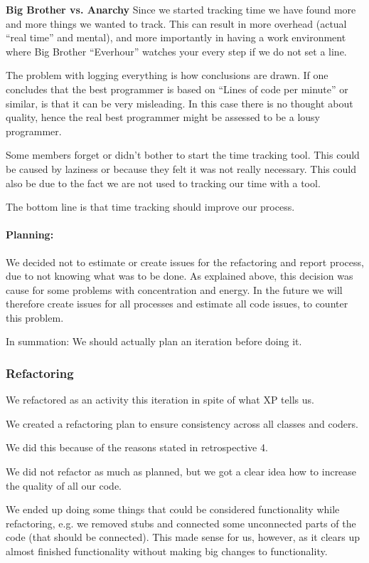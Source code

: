\textbf{Big Brother vs. Anarchy}
Since we started tracking time we have found more and more things we wanted to track. This can result in more overhead (actual “real time” and mental), and more importantly in having a work environment where Big Brother “Everhour” watches your every step if we do not set a line.

The problem with logging everything is how conclusions are drawn. If one concludes that the best programmer is based on “Lines of code per minute” or similar, is that it can be very misleading. In this case there is no thought about quality, hence the real best programmer might be assessed to be a lousy programmer.

Some members forget or didn’t bother to start the time tracking tool. This could be caused by laziness or because they felt it was not really necessary. This could also be due to the fact we are not used to tracking our time with a tool.

The bottom line is that time tracking should improve our process.


\paragraph{Planning:}
We decided not to estimate or create issues for the refactoring and report process, due to not knowing what was to be done.\linebreak
As explained above, this decision was cause for some problems with concentration and energy.
In the future we will therefore create issues for all processes and estimate all code issues, to counter this problem.

In summation: We should actually plan an iteration before doing it.


\subsubsection{Refactoring}
We refactored as an activity this iteration in spite of what XP tells us.

We created a refactoring plan to ensure consistency across all classes and coders.

We did this because of the reasons stated in retrospective 4.

We did not refactor as much as planned, but we got a clear idea how to increase the quality of all our code.

We ended up doing some things that could be considered functionality while refactoring, e.g. we removed stubs and connected some unconnected parts of the code (that should be connected). This made sense for us, however, as it clears up almost finished functionality without making big changes to functionality.

